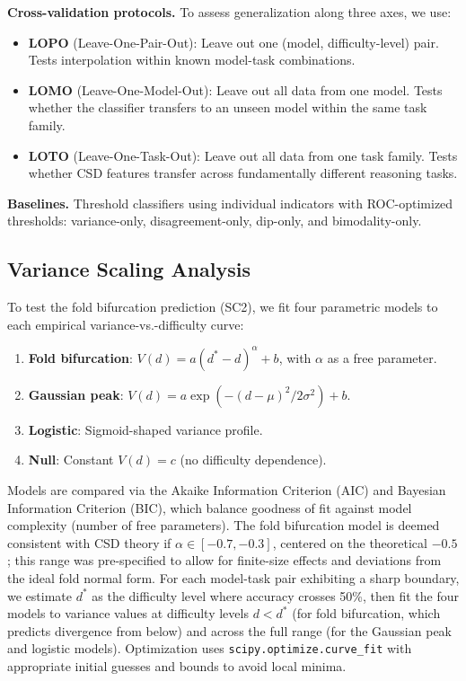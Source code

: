 \documentclass[11pt,letterpaper]{article}
\begin{document}
\textbf{Cross-validation protocols.} To assess generalization along three axes, we use:
\begin{itemize}
    \item \textbf{LOPO} (Leave-One-Pair-Out): Leave out one (model, difficulty-level) pair. Tests interpolation within known model-task combinations.
    \item \textbf{LOMO} (Leave-One-Model-Out): Leave out all data from one model. Tests whether the classifier transfers to an unseen model within the same task family.
    \item \textbf{LOTO} (Leave-One-Task-Out): Leave out all data from one task family. Tests whether CSD features transfer across fundamentally different reasoning tasks.
\end{itemize}

\textbf{Baselines.} Threshold classifiers using individual indicators with ROC-optimized thresholds: variance-only, disagreement-only, dip-only, and bimodality-only.

\subsection{Variance Scaling Analysis}

To test the fold bifurcation prediction (SC2), we fit four parametric models to each empirical variance-vs.-difficulty curve:
\begin{enumerate}
    \item \textbf{Fold bifurcation}: $V(d) = a(d^* - d)^{\alpha} + b$, with $\alpha$ as a free parameter.
    \item \textbf{Gaussian peak}: $V(d) = a \exp(-(d - \mu)^2 / 2\sigma^2) + b$.
    \item \textbf{Logistic}: Sigmoid-shaped variance profile.
    \item \textbf{Null}: Constant $V(d) = c$ (no difficulty dependence).
\end{enumerate}
Models are compared via the Akaike Information Criterion (AIC) and Bayesian Information Criterion (BIC), which balance goodness of fit against model complexity (number of free parameters). The fold bifurcation model is deemed consistent with CSD theory if $\alpha \in [-0.7, -0.3]$, centered on the theoretical $-0.5$; this range was pre-specified to allow for finite-size effects and deviations from the ideal fold normal form. For each model-task pair exhibiting a sharp boundary, we estimate $d^*$ as the difficulty level where accuracy crosses 50\%, then fit the four models to variance values at difficulty levels $d < d^*$ (for fold bifurcation, which predicts divergence from below) and across the full range (for the Gaussian peak and logistic models). Optimization uses \texttt{scipy.optimize.curve\_fit} with appropriate initial guesses and bounds to avoid local minima.
\end{document}
